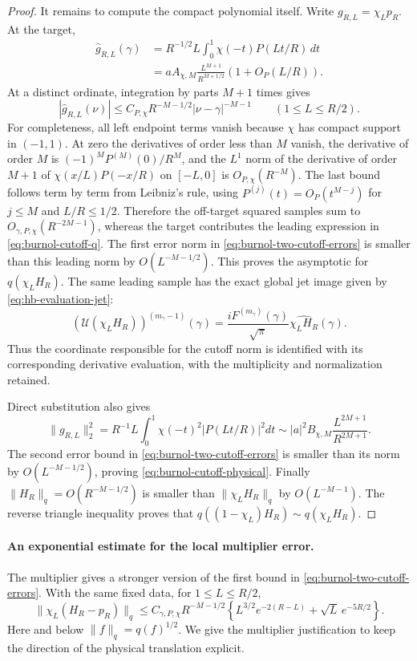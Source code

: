 \begin{proof}
It remains to compute the compact polynomial itself.
Write $g_{R,L}=\chi_Lp_R$. At the target,
\begin{align*}
 \widehat g_{R,L}(\gamma)
 &=R^{-1/2}L\int_0^1\chi(-t)P(Lt/R)\,dt\\
 &=aA_{\chi,M}\frac{L^{M+1}}{R^{M+1/2}}
                      \left(1+O_P(L/R)\right).
\end{align*}
At a distinct ordinate, integration by parts $M+1$ times
gives
\[
 |\widehat g_{R,L}(\nu)|
 \le C_{P,\chi}R^{-M-1/2}|\nu-\gamma|^{-M-1}
       \qquad(1\le L\le R/2).
\]
For completeness, all left endpoint terms vanish because
$\chi$ has compact support in $(-1,1)$. At zero the
derivatives of order less than $M$ vanish, the derivative
of order $M$ is $(-1)^MP^{(M)}(0)/R^M$, and the
$L^1$ norm of the derivative of order $M+1$ of
$\chi(x/L)P(-x/R)$ on $[-L,0]$ is $O_{P,\chi}(R^{-M})$.
The last bound follows term by term from Leibniz's rule,
using $P^{(j)}(t)=O_P(t^{M-j})$ for $j\le M$ and $L/R\le1/2$.
Therefore the off-target squared samples sum to
$O_{\gamma,P,\chi}(R^{-2M-1})$, whereas the target contributes
the leading expression in \eqref{eq:burnol-cutoff-q}.
The first error norm in \eqref{eq:burnol-two-cutoff-errors}
is smaller than this leading norm by
$O(L^{-M-1/2})$. This proves the asymptotic for
$q(\chi_LH_R)$.
The same leading sample has the exact global jet image
given by \eqref{eq:hb-evaluation-jet}:
\[
 (\mathcal U(\chi_LH_R))^{(m_\gamma-1)}(\gamma)
 =\frac{iF^{(m_\gamma)}(\gamma)}{\sqrt\pi}
                      \widehat{\chi_LH_R}(\gamma).
\]
Thus the coordinate responsible for the cutoff norm is
identified with its corresponding derivative evaluation,
with the multiplicity and normalization retained.

Direct substitution also gives
\[
 \|g_{R,L}\|_2^2
 =R^{-1}L\int_0^1\chi(-t)^2|P(Lt/R)|^2dt
 \sim |a|^2B_{\chi,M}\frac{L^{2M+1}}{R^{2M+1}}.
\]
The second error bound in \eqref{eq:burnol-two-cutoff-errors}
is smaller than its norm by $O(L^{-M-1/2})$, proving
\eqref{eq:burnol-cutoff-physical}. Finally
$\|H_R\|_q=O(R^{-M-1/2})$ is smaller than
$\|\chi_LH_R\|_q$ by $O(L^{-M-1})$.
The reverse triangle inequality proves that
$q((1-\chi_L)H_R)\sim q(\chi_LH_R)$.
\end{proof}

\paragraph{An exponential estimate for the local multiplier error.}
The multiplier gives a stronger version of the first
bound in \eqref{eq:burnol-two-cutoff-errors}. With the same
fixed data, for $1\le L\le R/2$,
\begin{equation}\label{eq:burnol-exp-local-error}
 \|\chi_L(H_R-p_R)\|_q
 \le C_{\gamma,P,\chi}R^{-M-1/2}
 \left\{L^{3/2}e^{-2(R-L)}
                    +\sqrt L\,e^{-5R/2}\right\}.
\end{equation}
Here and below $\|f\|_q=q(f)^{1/2}$.
We give the multiplier justification to keep the direction
of the physical translation explicit.

